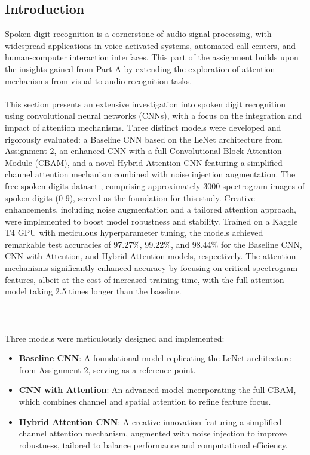 \documentclass[12pt]{article}
\begin{document}
\subsection{Introduction}
Spoken digit recognition is a cornerstone of audio signal processing, with widespread applications in voice-activated systems, automated call centers, and human-computer interaction interfaces. This part of the assignment builds upon the insights gained from Part A by extending the exploration of attention mechanisms from visual to audio recognition tasks.\\ \\
This section presents an extensive investigation into spoken digit recognition using convolutional neural networks (CNNs), with a focus on the integration and impact of attention mechanisms. Three distinct models were developed and rigorously evaluated: a Baseline CNN based on the LeNet architecture from Assignment 2, an enhanced CNN with a full Convolutional Block Attention Module (CBAM), and a novel Hybrid Attention CNN featuring a simplified channel attention mechanism combined with noise injection augmentation. The free-spoken-digits dataset \cite{free_spoken_digits}, comprising approximately 3000 spectrogram images of spoken digits (0-9), served as the foundation for this study. Creative enhancements, including noise augmentation and a tailored attention approach, were implemented to boost model robustness and stability. Trained on a Kaggle T4 GPU with meticulous hyperparameter tuning, the models achieved remarkable test accuracies of 97.27\%, 99.22\%, and 98.44\% for the Baseline CNN, CNN with Attention, and Hybrid Attention models, respectively. The attention mechanisms significantly enhanced accuracy by focusing on critical spectrogram features, albeit at the cost of increased training time, with the full attention model taking 2.5 times longer than the baseline.\\ \\ \\ \\
Three models were meticulously designed and implemented:
\begin{itemize}
    \item \textbf{Baseline CNN}: A foundational model replicating the LeNet architecture from Assignment 2, serving as a reference point.
    \item \textbf{CNN with Attention}: An advanced model incorporating the full CBAM, which combines channel and spatial attention to refine feature focus.
    \item \textbf{Hybrid Attention CNN}: A creative innovation featuring a simplified channel attention mechanism, augmented with noise injection to improve robustness, tailored to balance performance and computational efficiency.\\
\end{itemize}
\end{document}
